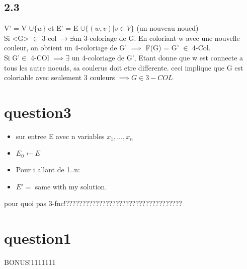\documentclass[a4paper]{article}
\begin{document}
\subsection*{2.3}
V' = V $\cup \{w\}$ et E' = E $\cup \{\left( w,v \right) | v \in V\} $ (un nouveau noued)\\

Si <G> $\in $ 3-col $\to  \exists  \text{un 3-coloriage}$ de G. En coloriant w avec une nouvelle couleur, on obtient un 4-coloriage de G' $\implies$ F(G) = G'  $\in $ 4-Col.\\

Si G'$\in $ 4-COl $\implies \exists$  un 4-coloriage de G', Etant donne que w est connecte a tous les autre noeuds, sa coulerus doit etre differente. ceci implique que G est coloriable avec seulement 3 couleurs $\implies G \in 3-COL$
\section*{question3}
\begin{itemize}
	\item [] sur entree E avec n variables $x_1,\ldots,x_{n}$ 
	\item[] \qquad $E_0 \gets E$ 
	\item[] Pour i allant de 1..n:
	\item[] \qquad\qquad  $E' = $ same with my solution.
\end{itemize}
pour quoi pas 3-fnc!???????????????????????????????????
\section*{question1}
BONUS!1111111
\end{document}
